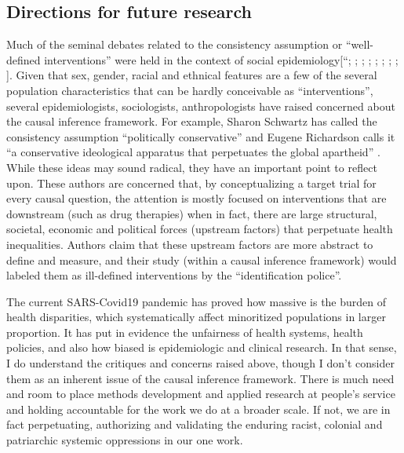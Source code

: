 \documentclass[
]{book}
\begin{document}
\hypertarget{directions-for-future-research}{%
\subsection{Directions for future research}\label{directions-for-future-research}}

Much of the seminal debates related to the consistency assumption or ``well-defined interventions'' were held in the context of social epidemiology{[}``\textcite{kaufman2003}; \textcite{vanderweele2014}; \textcite{glymour2014}; \textcite{kaufman2014}; \textcite{glymour2016}; \textcite{vandenbroucke2016}; \textcite{krieger2016}; \textcite{robinson2020}; \textcite{jackson2020}{]}. Given that sex, gender, racial and ethnical features are a few of the several population characteristics that can be hardly conceivable as ``interventions'', several epidemiologists, sociologists, anthropologists have raised concerned about the causal inference framework. For example, Sharon Schwartz has called the consistency assumption ``politically conservative''\autocite{schwartz2016} and Eugene Richardson calls it ``a conservative ideological apparatus that perpetuates the global apartheid'' \autocite{epidemicIllusions}. While these ideas may sound radical, they have an important point to reflect upon. These authors are concerned that, by conceptualizing a target trial for every causal question, the attention is mostly focused on interventions that are downstream (such as drug therapies) when in fact, there are large structural, societal, economic and political forces (upstream factors) that perpetuate health inequalities\autocite{kaufman2019}. Authors claim that these upstream factors are more abstract to define and measure, and their study (within a causal inference framework) would labeled them as ill-defined interventions by the ``identification police''\autocite{ruhm2018}.

The current SARS-Covid19 pandemic has proved how massive is the burden of health disparities, which systematically affect minoritized populations in larger proportion. It has put in evidence the unfairness of health systems, health policies, and also how biased is epidemiologic and clinical research\autocite{bailey2021,krieger2021,abimbola2021,bayingana2021}. In that sense, I do understand the critiques and concerns raised above, though I don't consider them as an inherent issue of the causal inference framework. There is much need and room to place methods development and applied research at people's service and holding accountable for the work we do at a broader scale. If not, we are in fact perpetuating, authorizing and validating the enduring racist, colonial and patriarchic systemic oppressions in our one work.
\end{document}
